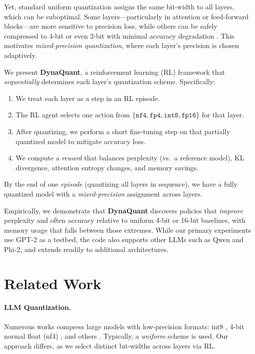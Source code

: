 \documentclass{article}
\begin{document}
	Yet, standard uniform quantization assigns the same bit-width to all layers, which can be suboptimal. Some layers—particularly in attention or feed-forward blocks—are more sensitive to precision loss, while others can be safely compressed to 4-bit or even 2-bit with minimal accuracy degradation \cite{dong2019hawq,dettmers2023qlora}. This motivates \emph{mixed-precision quantization}, where each layer's precision is chosen adaptively.
	
	We present \textbf{DynaQuant}, a reinforcement learning (RL) framework that \emph{sequentially} determines each layer's quantization scheme. Specifically:
	\begin{enumerate}
		\item We treat each layer as a step in an RL episode.
		\item The RL agent selects one action from $\{\texttt{nf4}, \texttt{fp4}, \texttt{int8}, \texttt{fp16}\}$ for that layer.
		\item After quantizing, we perform a short fine-tuning step on that partially quantized model to mitigate accuracy loss.
		\item We compute a \emph{reward} that balances perplexity (vs.\ a reference model), KL divergence, attention entropy changes, and memory savings.
	\end{enumerate}
	By the end of one \emph{episode} (quantizing all layers in sequence), we have a fully quantized model with a \emph{mixed-precision} assignment across layers.
	
	Empirically, we demonstrate that \textbf{DynaQuant} discovers policies that \emph{improve} perplexity and often accuracy relative to uniform 4-bit or 16-bit baselines, with memory usage that falls between those extremes. While our primary experiments use GPT-2 as a testbed, the code also supports other LLMs such as Qwen and Phi-2, and extends readily to additional architectures.
	
	
	\section{Related Work}
	\label{sec:related}
	\paragraph{LLM Quantization.}
	Numerous works compress large models with low-precision formats: int8 \cite{dettmers2022llmint8}, 4-bit normal float (nf4) \cite{frantar2022gptq}, and others \cite{malinovskii2024pvtuning}. Typically, a \emph{uniform} scheme is used. Our approach differs, as we select distinct bit-widths across layers via RL.
	
\end{document}
